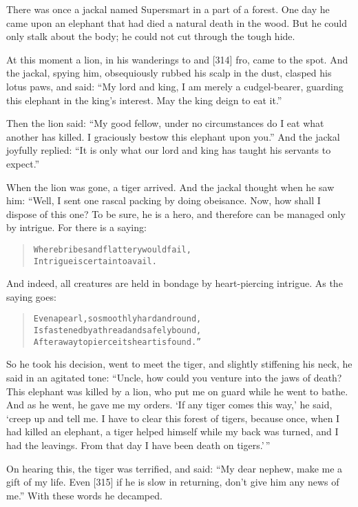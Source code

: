 \documentclass[article, twoside, 14pt]{memoir}
\renewenvironment{verbatim}{%
\begin{quote}%
\vskip -10pt%
\begin{alltt}\normalfont\large}{\end{alltt}%
\end{quote}%
\vskip -10pt
} %
\begin{document}
\label{s76}

There was once a jackal named Supersmart in a part of a forest. One
day he came upon an elephant that had died a natural death in the
wood. But he could only stalk about the body; he could not cut
through the tough hide.

At this moment a lion, in his wanderings to and [314] fro, came to
the spot. And the jackal, spying him, obsequiously rubbed his scalp
in the dust, clasped his lotus paws, and said:
``My lord and king, I am merely a cudgel-bearer, guarding this elephant in the king's interest. May the king deign to eat it.''

Then the lion said:
``My good fellow, under no circumstances do I eat what another has killed. I graciously bestow this elephant upon you.''
And the jackal joyfully replied:
``It is only what our lord and king has taught his servants to expect.''

When the lion was gone, a tiger arrived. And the jackal thought
when he saw him: “Well, I sent one rascal packing by doing
obeisance. Now, how shall I dispose of this one? To be sure, he is
a hero, and therefore can be managed only by intrigue. For there is
a saying:

\begin{verbatim}
Where bribes and flattery would fail,
Intrigue is certain to avail.
\end{verbatim}
And indeed, all creatures are held in bondage by heart-piercing
intrigue. As the saying goes:

\begin{verbatim}
Even a pearl, so smoothly hard and round,
Is fastened by a thread and safely bound,
After a way to pierce its heart is found.”
\end{verbatim}
So he took his decision, went to meet the tiger, and slightly
stiffening his neck, he said in an agitated tone:
``Uncle, how could you venture into the jaws of death? This elephant was killed by a lion, who put me on guard while he went to bathe. And as he went, he gave me my orders. `If any tiger comes this way,' he said, `creep up and tell me. I have to clear this forest of tigers, because once, when I had killed an elephant, a tiger helped himself while my back was turned, and I had the leavings. From that day I have been death on tigers.'\,''

On hearing this, the tiger was terrified, and said:
``My dear nephew, make me a gift of my life. Even [315] if he is slow in returning, don't give him any news of me.''
With these words he decamped.
\end{document}
